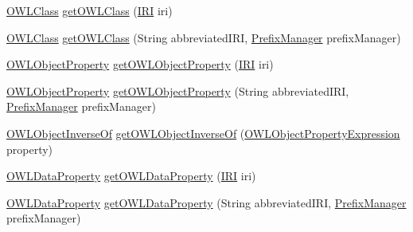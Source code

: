 \begin{DoxyCompactItemize}
\item 
\hyperlink{interfaceorg_1_1semanticweb_1_1owlapi_1_1model_1_1_o_w_l_class}{O\-W\-L\-Class} \hyperlink{interfaceorg_1_1semanticweb_1_1owlapi_1_1model_1_1_o_w_l_data_factory_a47bf989dbb53bd0ffbb03cf8d6eb23f7}{get\-O\-W\-L\-Class} (\hyperlink{classorg_1_1semanticweb_1_1owlapi_1_1model_1_1_i_r_i}{I\-R\-I} iri)
\item 
\hyperlink{interfaceorg_1_1semanticweb_1_1owlapi_1_1model_1_1_o_w_l_class}{O\-W\-L\-Class} \hyperlink{interfaceorg_1_1semanticweb_1_1owlapi_1_1model_1_1_o_w_l_data_factory_a0ac82c5c8f0497b26b1d4060704e8a49}{get\-O\-W\-L\-Class} (String abbreviated\-I\-R\-I, \hyperlink{interfaceorg_1_1semanticweb_1_1owlapi_1_1model_1_1_prefix_manager}{Prefix\-Manager} prefix\-Manager)
\item 
\hyperlink{interfaceorg_1_1semanticweb_1_1owlapi_1_1model_1_1_o_w_l_object_property}{O\-W\-L\-Object\-Property} \hyperlink{interfaceorg_1_1semanticweb_1_1owlapi_1_1model_1_1_o_w_l_data_factory_a979c212777f95f6a2f609308d6ad9d61}{get\-O\-W\-L\-Object\-Property} (\hyperlink{classorg_1_1semanticweb_1_1owlapi_1_1model_1_1_i_r_i}{I\-R\-I} iri)
\item 
\hyperlink{interfaceorg_1_1semanticweb_1_1owlapi_1_1model_1_1_o_w_l_object_property}{O\-W\-L\-Object\-Property} \hyperlink{interfaceorg_1_1semanticweb_1_1owlapi_1_1model_1_1_o_w_l_data_factory_a616b522bbf71995972b267ff1c7a40e5}{get\-O\-W\-L\-Object\-Property} (String abbreviated\-I\-R\-I, \hyperlink{interfaceorg_1_1semanticweb_1_1owlapi_1_1model_1_1_prefix_manager}{Prefix\-Manager} prefix\-Manager)
\item 
\hyperlink{interfaceorg_1_1semanticweb_1_1owlapi_1_1model_1_1_o_w_l_object_inverse_of}{O\-W\-L\-Object\-Inverse\-Of} \hyperlink{interfaceorg_1_1semanticweb_1_1owlapi_1_1model_1_1_o_w_l_data_factory_a76bf59f46a6a31f4f4a225679f6dde38}{get\-O\-W\-L\-Object\-Inverse\-Of} (\hyperlink{interfaceorg_1_1semanticweb_1_1owlapi_1_1model_1_1_o_w_l_object_property_expression}{O\-W\-L\-Object\-Property\-Expression} property)
\item 
\hyperlink{interfaceorg_1_1semanticweb_1_1owlapi_1_1model_1_1_o_w_l_data_property}{O\-W\-L\-Data\-Property} \hyperlink{interfaceorg_1_1semanticweb_1_1owlapi_1_1model_1_1_o_w_l_data_factory_ae851af372251d27e2f6a59e457ba3a11}{get\-O\-W\-L\-Data\-Property} (\hyperlink{classorg_1_1semanticweb_1_1owlapi_1_1model_1_1_i_r_i}{I\-R\-I} iri)
\item 
\hyperlink{interfaceorg_1_1semanticweb_1_1owlapi_1_1model_1_1_o_w_l_data_property}{O\-W\-L\-Data\-Property} \hyperlink{interfaceorg_1_1semanticweb_1_1owlapi_1_1model_1_1_o_w_l_data_factory_ab49fccef5611362b04383164ca508a51}{get\-O\-W\-L\-Data\-Property} (String abbreviated\-I\-R\-I, \hyperlink{interfaceorg_1_1semanticweb_1_1owlapi_1_1model_1_1_prefix_manager}{Prefix\-Manager} prefix\-Manager)

\end{DoxyCompactItemize}
